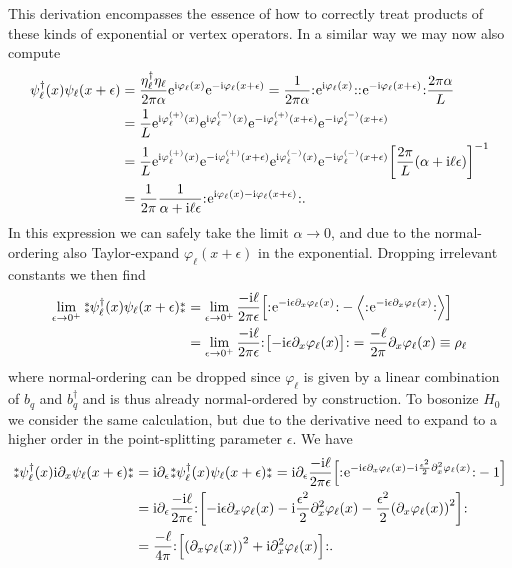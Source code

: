 \documentclass[english, parskip=full]{scrartcl}
\begin{document}
This derivation encompasses the essence of how to correctly treat products of these kinds of exponential or vertex operators.
In a similar way we may now also compute
\begin{align}
\psi_\ell^\dagger(x) \psi_\ell(x+\epsilon) &= \frac{\eta_\ell^\dagger \eta_\ell}{2\pi \alpha} \powe{\i\varphi_\ell(x)} \powe{-\i\varphi_\ell(x+\epsilon)} = \frac{1}{2\pi \alpha} \normord{\powe{\i\varphi_\ell(x)}} \normord{\powe{-\i\varphi_\ell(x+\epsilon)}} \frac{2\pi \alpha}{L} \\
&= \frac{1}{L} \powe{\i\varphi_\ell^{(+)}(x)} \powe{\i\varphi_\ell^{(-)}(x)} \powe{-\i\varphi_\ell^{(+)}(x+\epsilon)} \powe{-\i\varphi_\ell^{(-)}(x+\epsilon)} \\
&= \frac{1}{L} \powe{\i\varphi_\ell^{(+)}(x)} \powe{-\i\varphi_\ell^{(+)}(x+\epsilon)} \powe{\i\varphi_\ell^{(-)}(x)} \powe{-\i\varphi_\ell^{(-)}(x+\epsilon)} \klb*{\frac{2\pi}{L} \kla*{\alpha + \i\ell\epsilon}}^{-1} \\
&= \frac{1}{2\pi} \frac{1}{\alpha + \i\ell\epsilon} \normord{\powe{\i \varphi_\ell(x) - \i\varphi_\ell(x+\epsilon)}}.
\end{align}
In this expression we can safely take the limit $\alpha\rightarrow 0$, and due to the normal-ordering also Taylor-expand $\varphi_\ell(x+\epsilon)$ in the exponential.
Dropping irrelevant constants we then find
\begin{align}
\lim_{\epsilon\rightarrow 0^+} \varnormord{\psi_\ell^\dagger(x) \psi_\ell(x+\epsilon)} &= \lim_{\epsilon\rightarrow 0^+} \frac{-\i\ell}{2\pi\epsilon} \klb*{\normord{\powe{-\i \epsilon\partial_x\varphi_\ell(x)}} - \bra*{\normord{\powe{-\i \epsilon\partial_x\varphi_\ell(x)}}}} \\
&= \lim_{\epsilon\rightarrow 0^+} \frac{-\i\ell}{2\pi\epsilon} \normord{\klb[\big]{-\i\epsilon\partial_x\varphi_\ell(x)}} = \frac{-\ell}{2\pi} \partial_x\varphi_\ell(x) \equiv \rho_\ell
\end{align}
where normal-ordering can be dropped since $\varphi_\ell$ is given by a linear combination of $b_q$ and $b_q^\dagger$ and is thus already normal-ordered by construction.
To bosonize $H_0$ we consider the same calculation, but due to the derivative need to expand to a higher order in the point-splitting parameter $\epsilon$.
We have
\begin{align}
\varnormord{\psi_\ell^\dagger(x) \i\partial_x \psi_\ell(x+\epsilon)} &= \i\partial_\epsilon \varnormord{\psi_\ell^\dagger (x) \psi_\ell(x+\epsilon)} = \i\partial_\epsilon \frac{-\i\ell}{2\pi\epsilon} \klb*{\normord{\powe{-\i\epsilon\partial_x\varphi_\ell(x) - \i \frac{\epsilon^2}{2} \partial_x^2\varphi_\ell(x)}} - 1} \\
&= \i\partial_\epsilon \frac{-\i\ell}{2\pi\epsilon} \normord{\klb*{-\i\epsilon\partial_x\varphi_\ell(x) - \i \frac{\epsilon^2}{2} \partial_x^2\varphi_\ell(x) - \frac{\epsilon^2}{2} \kla*{\partial_x\varphi_\ell(x)}^2}}\\
&= \frac{-\ell}{4\pi} \normord{\klb*{\kla*{\partial_x\varphi_\ell(x)}^2 + \i \partial_x^2\varphi_\ell(x)}}.
\end{align}
\end{document}
